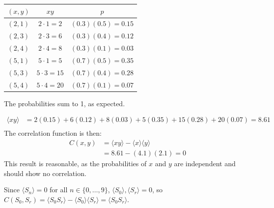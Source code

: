 \documentclass{article}
\begin{document}
\begin{center}
\begin{tabular}{|c|c|c|}
    \hline
    $\left(x, y\right)$ & $xy$ & $p$  \\
    \hline
    $\left(2, 1\right)$ & $2 \cdot 1 = 2$ & $\left(0.3\right)\left(0.5\right) = 0.15$ \\
    \hline
    $\left(2, 3\right)$ & $2 \cdot 3 = 6$ & $\left(0.3\right)\left(0.4\right) = 0.12$ \\
    \hline
    $\left(2, 4\right)$ & $2 \cdot 4 = 8$ & $\left(0.3\right)\left(0.1\right) = 0.03$ \\
    \hline
    $\left(5, 1\right)$ & $5 \cdot 1 = 5$ & $\left(0.7\right)\left(0.5\right) = 0.35$ \\
    \hline
    $\left(5, 3\right)$ & $5 \cdot 3 = 15$ & $\left(0.7\right)\left(0.4\right) = 0.28$ \\
    \hline
    $\left(5, 4\right)$ & $5 \cdot 4 = 20$ & $\left(0.7\right)\left(0.1\right) = 0.07$ \\
    \hline
\end{tabular}
\end{center}
The probabilities sum to 1, as expected.

\begin{equation}
    \begin{split}
        \langle xy \rangle & = 2\left(0.15\right) + 6\left(0.12\right) + 8\left(0.03\right) + 5\left(0.35\right) + 15\left(0.28\right) + 20\left(0.07\right) = 8.61 \\
    \end{split}
\end{equation}
The correlation function is then:
\begin{equation}
    \begin{split}
        C\left(x, y\right) & = \langle xy \rangle - \langle x \rangle \langle y \rangle \\
        & = 8.61 - \left(4.1\right)\left(2.1\right) = 0
    \end{split}
\end{equation}
This result is reasonable, as the probabilities of $x$ and $y$ are independent and should show no correlation.

\clearpage

\problem
Since $\langle S_n \rangle = 0$ for all $n \in \{0, \ldots, 9\}$,  $\langle S_0\rangle, \langle S_r \rangle = 0$, so $C(S_0, S_r) = \langle S_0S_r \rangle - \langle S_0\rangle\langle S_r \rangle = \langle S_0S_r \rangle$.
\end{document}
